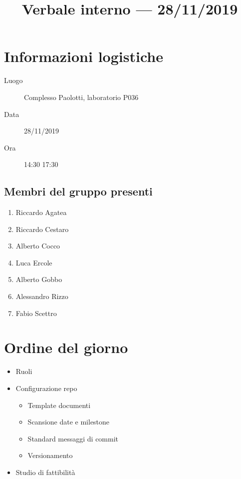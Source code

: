 \documentclass{article}
\title{Verbale interno --- 28/11/2019}
\begin{document}


\section{Informazioni logistiche}%
\label{sec:informazioni_logistiche}

\begin{description}
  \item [Luogo] Complesso Paolotti, laboratorio P036
  \item [Data] 28/11/2019
  \item [Ora] 14:30  17:30
\end{description}

\subsection{Membri del gruppo presenti}%
\label{sub:membri_del_gruppo_presenti}

\begin{enumerate}
  \item Riccardo Agatea
  \item Riccardo Cestaro
  \item Alberto Cocco
  \item Luca Ercole
  \item Alberto Gobbo
  \item Alessandro Rizzo
  \item Fabio Scettro
\end{enumerate}


\section{Ordine del giorno}%
\label{sec:ordine_del_giorno}

\begin{itemize}
  \item Ruoli
  \item Configurazione repo
        \begin{itemize}
          \item Template documenti
          \item Scansione date e milestone
          \item Standard messaggi di commit
          \item Versionamento
        \end{itemize}
  \item Studio di fattibilità
\end{itemize}
\end{document}
